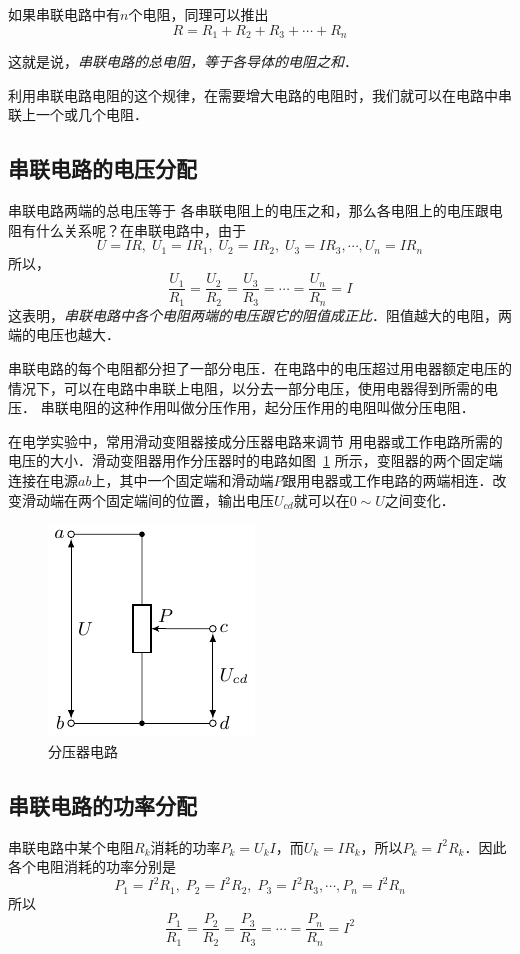 如果串联电路中有$n$个电阻，同理可以推出
\[R=R_1+R_2+R_3+\cdots+R_n\]

这就是说，\textit{串联电路的总电阻，等于各导体的电阻之和}．

利用串联电路电阻的这个规律，在需要增大电路的电阻时，我们就可以在电路中串联上一个或几个电阻．

\subsection{串联电路的电压分配}
串联电路两端的总电压等于
各串联电阻上的电压之和，那么各电阻上的电压跟电阻有什么关系呢？在串联电路中，由于
\[U=IR,\;  U_1=IR_1,\; U_2=IR_2,\; U_3=IR_3,\cdots, U_n=IR_n\]
所以，
\[\frac{U_1}{R_1}=\frac{U_2}{R_2}=\frac{U_3}{R_3}=\cdots=\frac{U_n}{R_n}=I \]
这表明，\textit{串联电路中各个电阻两端的电压跟它的阻值成正比}．阻值越大的电阻，两端的电压也越大．

串联电路的每个电阻都分担了一部分电压．在电路中的电压超过用电器额定电压的情况下，可以在电路中串联上电阻，以分去一部分电压，使用电器得到所需的电压．
串联电阻的这种作用叫做分压作用，起分压作用的电阻叫做分压电阻．

在电学实验中，常用滑动变阻器接成分压器电路来调节
用电器或工作电路所需的电压的大小．滑动变阻器用作分压器时的电路如图~\ref{fig_B_7-7} 所示，变阻器的两个固定端连接在电源$ab$上，其中一个固定端和滑动端$P$跟用电器或工作电路的两端相连．改变滑动端在两个固定端间的位置，输出电压$U_{cd}$就可以在$0 \sim U$之间变化．
\begin{figure}[htbp]
	\centering
	\includegraphics{fig/B/7-7.pdf}
	\caption{分压器电路}\label{fig_B_7-7}
\end{figure}

\subsection{串联电路的功率分配} 串联电路中某个电阻$R_k$消耗的功率$P_k=U_kI$，而$U_k=IR_k$，所以$P_k=I^2R_k$．因此各个电阻消耗的功率分别是
\[P_1=I^2R_1,\; P_2=I^2R_2,\; P_3=I^2R_3,\cdots, P_n=I^2R_n\]
所以
\[\frac{P_1}{R_1}=\frac{P_2}{R_2}=\frac{P_3}{R_3}=\cdots=\frac{P_n}{R_n}=I^2 \]

